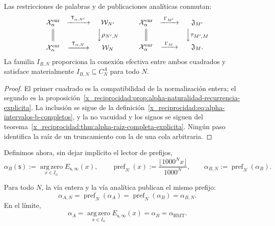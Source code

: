 \begin{proposition}
\label{x_reciprocidad:prop:alpha-cuadrados-compatibilidad}
Las restricciones de palabras y de publicaciones analíticas conmutan:
\[
\begin{array}{ccc}
 \mathcal X_\alpha^{\mathrm{enr}}&
 \xrightarrow{\ \mathsf T_{\alpha,N'}\ }&\mathcal W_{N'}\\[1mm]
 \Big\Vert&&\Big\downarrow\rho_{N',N}\\[1mm]
 \mathcal X_\alpha^{\mathrm{enr}}&
 \xrightarrow{\ \mathsf T_{\alpha,N}\ }&\mathcal W_N
\end{array}
\qquad
\begin{array}{ccc}
 \mathcal X_\alpha^{\mathrm{enr}}&
 \xrightarrow{\ \Gamma_{M'}\ }&\mathfrak J_{M'}\\[1mm]
 \Big\Vert&&\Big\downarrow\tau_{M',M}\\[1mm]
 \mathcal X_\alpha^{\mathrm{enr}}&
 \xrightarrow{\ \Gamma_M\ }&\mathfrak J_M .
\end{array}
\]
La familia \(I_{B,N}\) proporciona la conexión efectiva entre ambos
cuadrados y satisface materialmente
\(I_{B,N}\subseteq C_N^A\) para todo \(N\).
\end{proposition}

\begin{proof}
El primer cuadrado es la compatibilidad de la normalización entera; el segundo
es la proposición~\ref{x_reciprocidad:prop:alpha-naturalidad-recurrencia-explicita}. La
inclusión se sigue de la definición~\eqref{x_reciprocidad:eq:alpha-intervalos-b-completos},
y la no vacuidad y los signos se siguen del
teorema~\ref{x_reciprocidad:thm:alpha-raiz-completa-explicita}. Ningún paso identifica la
raíz de un truncamiento con la de una cola arbitraria.
\end{proof}

Definimos ahora, sin dejar implícito el lector de prefijos,
\begin{equation}
 \alpha_B(\mathsf s):=
 \operatorname*{arg\,zero}_{x\in I_\alpha}E_{\mathsf s,\infty}(x),
 \qquad
 \operatorname{pref}_N(x):=
 \frac{\lfloor1000^Nx\rfloor}{1000^N},
 \qquad
 \alpha_{B,N}:=\operatorname{pref}_N(\alpha_B).
 \label{x_reciprocidad:eq:alpha-definicion-b-y-prefijos-rev08}
\end{equation}

\begin{theorem}
\label{x_reciprocidad:thm:alpha-dos-publicaciones-completas}
Para todo \(N\), la vía entera y la vía analítica publican el mismo prefijo:
\begin{equation}
 \boxed{\alpha_{A,N}=\operatorname{pref}_N(\alpha_A)
 =\operatorname{pref}_N(\alpha_B)=\alpha_{B,N}.}
 \label{x_reciprocidad:eq:alpha-dos-vias-cada-nivel}
\end{equation}
En el límite,
\begin{equation}
 \boxed{\alpha_A
 =\operatorname*{arg\,zero}_{x\in I_\alpha}
       E_{\mathsf s,\infty}(x)
 =\alpha_B=\alpha_{\mathrm{HMT}}.}
 \label{x_reciprocidad:eq:alpha-dos-vias-limite-coinductivo}
\end{equation}
\end{theorem}

